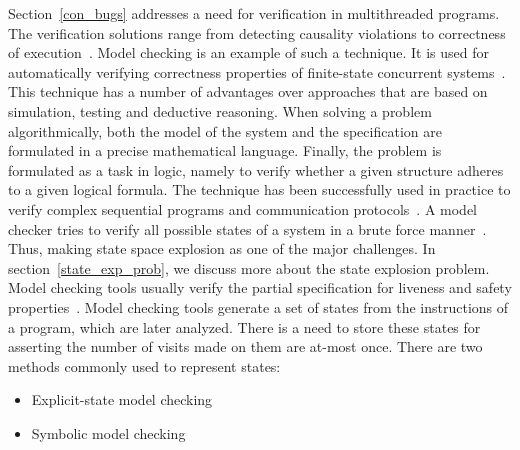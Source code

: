 Section~\ref{con_bugs} addresses a need for verification in multithreaded programs. 
The verification solutions range from detecting causality violations to correctness of execution~\citep{d2008survey}. 
Model checking is an example of such a technique. 
It is used for automatically verifying correctness properties of finite-state concurrent systems~\citep{model_check}\citep{berard2013systems}. 
This technique has a number of advantages over approaches that are based on simulation, testing and deductive reasoning. 
When solving a problem algorithmically, both the model of the system and the specification are formulated in a precise mathematical language. 
Finally, the problem is formulated as a task in logic, namely to verify whether a given structure adheres to a given logical formula.  
The technique has been successfully used in practice to verify complex sequential programs and communication protocols~\citep{model_check}. 
A model checker tries to verify all possible states of a system in a brute force manner~\citep{model_checking_principles}. 
Thus, making state space explosion as one of the major challenges.
In section~\ref{state_exp_prob}, we discuss more about the state explosion problem. 
Model checking tools usually verify the partial specification for liveness and safety properties~\citep{d2008survey}. 
Model checking tools generate a set of states from the instructions of a program, which are later analyzed. 
There is a need to store these states for asserting the number of visits made on them are at-most once. 
There are two methods commonly used to represent states:
\begin{itemize}
\item	Explicit-state model checking
\item	Symbolic model checking
\end{itemize}

